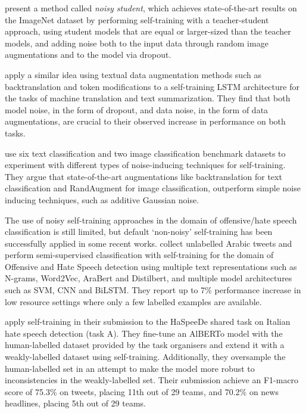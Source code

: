 \documentclass[11pt,a4paper]{article}
\begin{document}
\citet{noisystudent} present a method called \textit{noisy student}, which achieves state-of-the-art results on the ImageNet dataset \citep{imagenet} by performing self-training with a teacher-student approach, using student models that are equal or larger-sized than the teacher models, and adding noise both to the input data through random image augmentations and to the model via dropout.

\citet{selftrainingseq} apply a similar idea using textual data augmentation methods such as backtranslation \citep{backtranslation} and token modifications to a self-training LSTM architecture for the tasks of machine translation and text summarization. They find that both model noise, in the form of dropout, and data noise, in the form of data augmentations, are crucial to their observed increase in performance on both tasks.

\citet{xie2020unsupervised} use six text classification and two image classification benchmark datasets to experiment with different types of noise-inducing techniques for self-training. They argue that state-of-the-art augmentations like backtranslation for text classification and RandAugment \citep{randaugment} for image classification, outperform simple noise inducing techniques, such as additive Gaussian noise.

The use of noisy self-training approaches in the domain of offensive/hate speech classification is still limited, but default `non-noisy' self-training has been successfully applied in some recent works. \citet{doi:10.1080/08839514.2021.1988443} collect unlabelled Arabic tweets and perform semi-supervised classification with self-training for the domain of Offensive and Hate Speech detection using multiple text representations such as N-grams, Word2Vec, AraBert and Distilbert, and multiple model architectures such as SVM, CNN and BiLSTM. They report up to 7\% performance increase in low resource settings where only a few labelled examples are available.



\citet{leonardelli2020dh} apply self-training in their submission to the HaSpeeDe shared task on Italian hate speech detection (task A). They fine-tune an AlBERTo model with the human-labelled dataset provided by the task organisers and extend it with a weakly-labelled dataset using self-training. Additionally, they oversample the human-labelled set in an attempt to make the model more robust to inconsistencies in the weakly-labelled set. Their submission achieve an F1-macro score of 75.3\% on tweets, placing 11th out of 29 teams, and 70.2\% on news headlines, placing 5th out of 29 teams.
\end{document}
